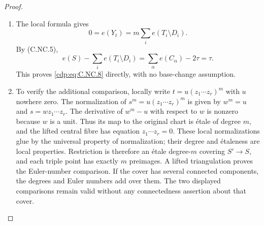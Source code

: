\begin{proof}

\begin{enumerate}[label={$\langle1\rangle$\arabic*.},leftmargin=*]
\item The local formula  gives
\[
 0=e(Y_t)=m\sum_i e(T_i\setminus D_i).
\]
By (C.NC.5),
\[
 e(S)-\sum_i e(T_i\setminus D_i)
 =\sum_\alpha e(C_\alpha)-2\tau=\tau.
\]
This proves \eqref{cdp:eq:C.NC.8} directly, with no base-change assumption.

\item To verify the additional comparison, locally write $t=u(z_1\cdots z_r)^m$ with $u$ nowhere zero. The normalization of $s^m=u(z_1\cdots z_r)^m$ is given by
$w^m=u$ and $s=wz_1\cdots z_r$.
The derivative of $w^m-u$ with respect to $w$ is nonzero because $w$ is a unit. Thus its map to the original chart is étale of degree $m$, and the lifted central fibre has equation $z_1\cdots z_r=0$. These local normalizations glue by the universal property of normalization; their degree and étaleness are local properties. Restriction is therefore an étale degree-$m$ covering $S'\to S$, and each triple point has exactly $m$ preimages. A lifted triangulation proves the Euler-number comparison. If the cover has several connected components, the degrees and Euler numbers add over them. The two displayed comparisons remain valid without any connectedness assertion about that cover.

\end{enumerate}
\end{proof}
